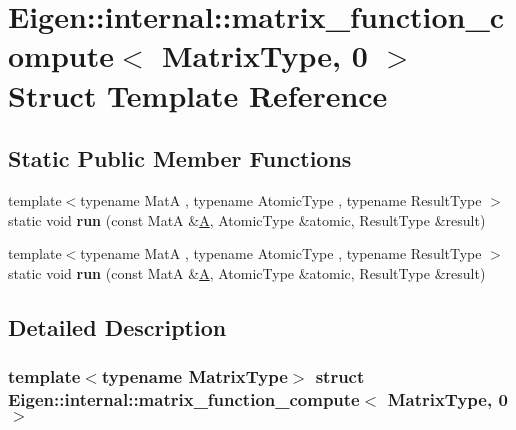 \hypertarget{struct_eigen_1_1internal_1_1matrix__function__compute_3_01_matrix_type_00_010_01_4}{}\section{Eigen\+:\+:internal\+:\+:matrix\+\_\+function\+\_\+compute$<$ Matrix\+Type, 0 $>$ Struct Template Reference}
\label{struct_eigen_1_1internal_1_1matrix__function__compute_3_01_matrix_type_00_010_01_4}
\subsection*{Static Public Member Functions}
\begin{DoxyCompactItemize}
\item 
\mbox{\label{struct_eigen_1_1internal_1_1matrix__function__compute_3_01_matrix_type_00_010_01_4_ade2dde964eb0b03fb28a13d5d33696e3}} 
{\footnotesize template$<$typename MatA , typename Atomic\+Type , typename Result\+Type $>$ }\\static void {\bfseries run} (const MatA \&\hyperlink{group___core___module_class_eigen_1_1_matrix}{A}, Atomic\+Type \&atomic, Result\+Type \&result)
\item 
\mbox{\label{struct_eigen_1_1internal_1_1matrix__function__compute_3_01_matrix_type_00_010_01_4_ade2dde964eb0b03fb28a13d5d33696e3}} 
{\footnotesize template$<$typename MatA , typename Atomic\+Type , typename Result\+Type $>$ }\\static void {\bfseries run} (const MatA \&\hyperlink{group___core___module_class_eigen_1_1_matrix}{A}, Atomic\+Type \&atomic, Result\+Type \&result)
\end{DoxyCompactItemize}


\subsection{Detailed Description}
\subsubsection*{template$<$typename Matrix\+Type$>$\newline
struct Eigen\+::internal\+::matrix\+\_\+function\+\_\+compute$<$ Matrix\+Type, 0 $>$}



